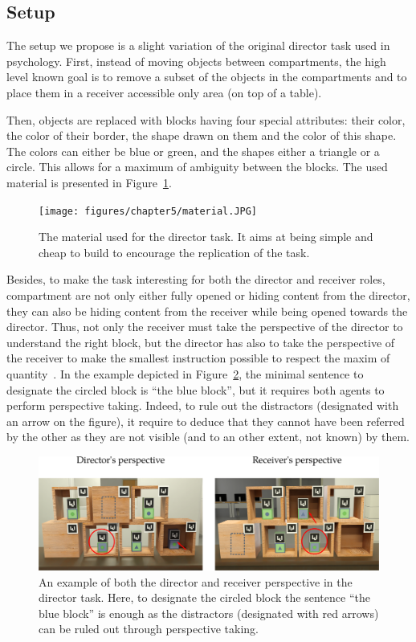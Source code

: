 \documentclass[a4paper,11pt,twoside]{StyleThese}
\begin{document}
\subsection{Setup}
The setup we propose is a slight variation of the original director task used in psychology. First, instead of moving objects between compartments, the high level known goal is to remove a subset of the objects in the compartments and to place them in a receiver accessible only area (on top of a table). 


Then, objects are replaced with blocks having four special attributes: their color, the color of their border, the shape drawn on them and the color of this shape. The colors can either be blue or green, and the shapes either a triangle or a circle. This allows for a maximum of ambiguity between the blocks. The used material is presented in Figure~\ref{fig:chap5material}.

\begin{figure}[hbtp]
\centering
\texttt{[image: figures/chapter5/material.JPG]}
\caption{The material used for the director task. It aims at being simple and cheap to build to encourage the replication of the task.}
\label{fig:chap5material}
\end{figure}

Besides, to make the task interesting for both the director and receiver roles, compartment are not only either fully opened or hiding content from the director, they can also be hiding content from the receiver while being opened towards the director. Thus, not only the receiver must take the perspective of the director to understand the right block, but the director has also to take the perspective of the receiver to make the smallest instruction possible to respect the maxim of quantity~\cite{grice1975logic}. In the example depicted in Figure~\ref{fig:chap5dtpersp}, the minimal sentence to designate the circled block is ``the blue block'', but it requires both agents to perform perspective taking. Indeed, to rule out the distractors (designated with an arrow on the figure), it require to deduce that they cannot have been referred by the other as they are not visible (and to an other extent, not known) by them.

\begin{figure}[hbtp]
\centering
\includegraphics[width=\textwidth]{figures/chapter5/setup.png}
\caption{An example of both the director and receiver perspective in the director task. Here, to designate the circled block the sentence ``the blue block'' is enough as the distractors (designated with red arrows) can be ruled out through perspective taking.}
\label{fig:chap5dtpersp}
\end{figure}
\end{document}
